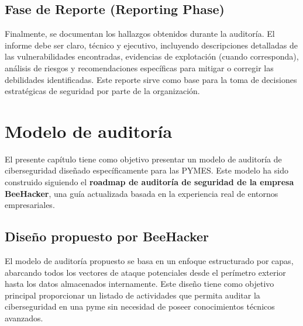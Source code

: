 \documentclass[a4paper, 11pt]{article}
\begin{document}
\subsection{Fase de Reporte (Reporting Phase)}

Finalmente, se documentan los hallazgos obtenidos durante la auditoría. El informe debe ser claro, técnico y ejecutivo, incluyendo descripciones detalladas de las vulnerabilidades encontradas, evidencias de explotación (cuando corresponda), análisis de riesgos y recomendaciones específicas para mitigar o corregir las debilidades identificadas. Este reporte sirve como base para la toma de decisiones estratégicas de seguridad por parte de la organización.






















\clearpage



\section{Modelo de auditoría}
\par\vspace{0.5cm}

El presente capítulo tiene como objetivo presentar un modelo de auditoría de ciberseguridad diseñado específicamente para las PYMES. 
Este modelo ha sido construido siguiendo el \textbf{roadmap de auditoría de seguridad de la empresa BeeHacker}, 
una guía actualizada basada en la experiencia real de entornos empresariales. 
\par\vspace{0.5cm}

\subsection{Diseño propuesto por BeeHacker}
\par\vspace{0.5cm}

El modelo de auditoría propuesto se basa en un enfoque estructurado por capas, abarcando todos los vectores de ataque 
potenciales desde el perímetro exterior hasta los datos almacenados internamente. 
Este diseño tiene como objetivo principal proporcionar un listado de actividades que permita
auditar la ciberseguridad en una pyme sin necesidad de poseer conocimientos técnicos avanzados. 
\end{document}
